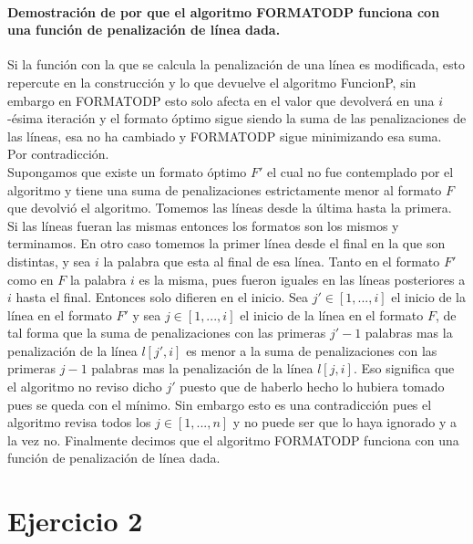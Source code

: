 \documentclass[12pt]{article}
\begin{document}
	\paragraph{Demostración de por que el algoritmo FORMATODP funciona con una función de penalización de línea dada.} 
	Si la función con la que se calcula la penalización de una línea es modificada, esto repercute en la construcción y lo que devuelve el algoritmo FuncionP, sin embargo en FORMATODP esto solo afecta en el valor que devolverá en una $i$-ésima iteración y el formato óptimo sigue siendo la suma de las penalizaciones de las líneas, esa no ha cambiado y FORMATODP sigue minimizando esa suma.\\
	Por contradicción.\\
	Supongamos que existe un formato óptimo $F'$ el cual no fue contemplado por el algoritmo y tiene una suma de penalizaciones estrictamente menor al formato $F$ que devolvió el algoritmo. Tomemos las líneas desde la última hasta la primera. Si las líneas fueran las mismas entonces los formatos son los mismos y terminamos. En otro caso tomemos la primer línea desde el final en la que son distintas, y sea $i$ la palabra que esta al final de esa línea. Tanto en el formato $F'$ como en $F$ la palabra $i$ es la misma, pues fueron iguales en las líneas posteriores a $i$ hasta el final. Entonces solo difieren en el inicio. Sea $j'\in[1,...,i]$ el inicio de la línea en el formato $F'$ y sea $j\in[1,...,i]$ el inicio de la línea en el formato $F$, de tal forma que la suma de penalizaciones con las primeras $j'-1$ palabras mas la penalización de la línea $l[j',i]$ es menor a la suma de penalizaciones con las primeras $j-1$ palabras mas la penalización de la línea $l[j,i]$. Eso significa que el algoritmo no reviso dicho $j'$ puesto que de haberlo hecho lo hubiera tomado pues se queda con el mínimo. Sin embargo esto es una contradicción pues el algoritmo revisa todos los $j\in[1,...,n]$ y no puede ser que lo haya ignorado y a la vez no. Finalmente decimos que el algoritmo FORMATODP funciona con una función de penalización de línea dada.
	 
	
\section{Ejercicio 2}
\end{document}
